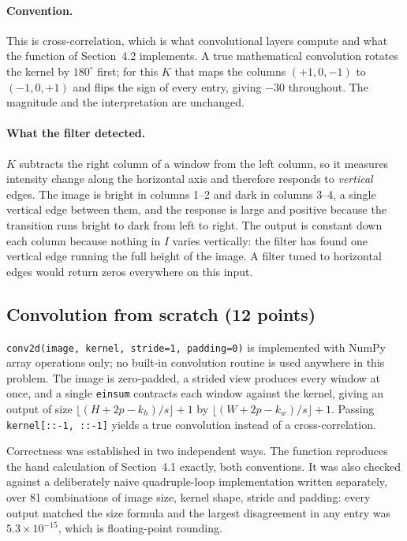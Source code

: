 \documentclass[11pt,a4paper]{article}
\newcommand{\code}[1]{\texttt{#1}}
\begin{document}
\paragraph{Convention.} This is cross-correlation, which is what convolutional
layers compute and what the function of Section~4.2 implements. A true mathematical
convolution rotates the kernel by $180^{\circ}$ first; for this $K$ that maps the
columns $(+1,0,-1)$ to $(-1,0,+1)$ and flips the sign of every entry, giving
$-30$ throughout. The magnitude and the
interpretation are unchanged.

\paragraph{What the filter detected.} $K$ subtracts the right column of a window
from the left column, so it measures intensity change along the horizontal axis and
therefore responds to \emph{vertical} edges. The image is bright in columns 1--2 and
dark in columns 3--4, a single vertical edge between them, and the response is large
and positive because the transition runs bright to dark from left to right. The
output is constant down each column because nothing in $I$ varies vertically: the
filter has found one vertical edge running the full height of the image. A filter
tuned to horizontal edges would return zeros everywhere on this input.

\subsection{Convolution from scratch (12 points)}

\code{conv2d(image, kernel, stride=1, padding=0)} is implemented with NumPy array
operations only; no built-in convolution routine is used anywhere in this problem.
The image is zero-padded, a strided view produces every window at once, and a single
\code{einsum} contracts each window against the kernel, giving an output of size
$\lfloor (H+2p-k_h)/s\rfloor+1$ by $\lfloor (W+2p-k_w)/s\rfloor+1$. Passing
\code{kernel[::-1, ::-1]} yields a true convolution instead of a cross-correlation.

Correctness was established in two independent ways. The function reproduces the hand
calculation of Section~4.1 exactly, both conventions. It was also checked against a
deliberately naive quadruple-loop implementation written separately, over
81 combinations of image size, kernel shape,
stride and padding: every output matched the size formula and the largest
disagreement in any entry was $5.3\times 10^{-15}$, which is
floating-point rounding.
\end{document}
